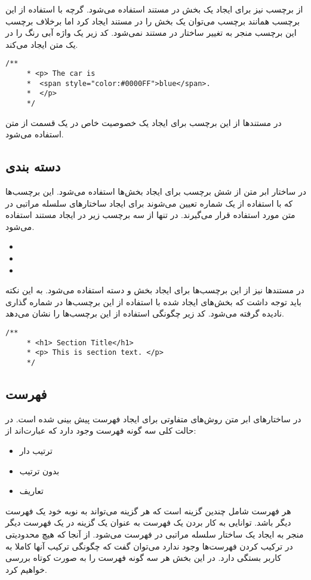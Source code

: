 از برچسب  نیز برای ایجاد یک بخش در مستند استفاده می‌شود. گرچه با استفاده از این برچسب
همانند برچسب  می‌توان یک بخش را در مستند ایجاد کرد اما برخلاف برچسب  این برچسب
منجر به تغییر ساختار در مستند نمی‌شود. کد زیر یک واژه آبی رنگ را در یک متن ایجاد می‌کند.
\begin{latin}
\lstset{language=C++}  
\begin{lstlisting}[frame=single] 
    /**
     * <p> The car is 
     * 	<span style="color:#0000FF">blue</span>.
     * 	</p>
     */
\end{lstlisting}
\end{latin}
در مستندها از این برچسب برای ایجاد یک خصوصیت خاص در یک قسمت از متن استفاده می‌شود.


\subsection{دسته بندی}
در ساختار ابر متن از شش برچسب برای ایجاد بخش‌ها استفاده می‌شود. این برچسب‌ها که با استفاده از
یک شماره تعیین می‌شوند برای ایجاد ساختارهای سلسله مراتبی در متن مورد استفاده قرار می‌گیرند. در
تنها از سه برچسب زیر در ایجاد مستند استفاده می‌شود.
\begin{itemize}
 \item {}
 \item {}
 \item {}
\end{itemize}
در مستندها نیز از این برچسب‌ها برای ایجاد بخش و دسته استفاده می‌شود. به این نکته باید توجه داشت که
بخش‌های ایجاد شده با استفاده از این برچسب‌ها در شماره گذاری نادیده گرفته می‌شود. کد زیر چگونگی 
استفاده از این برچسب‌ها را نشان می‌دهد.
\begin{latin}
\lstset{language=C++}  
\begin{lstlisting}[frame=single] 
    /**
     * <h1> Section Title</h1>
     * <p> This is section text. </p>
     */
\end{lstlisting}
\end{latin}

\subsection{فهرست}
در ساختارهای ابر متن روش‌های متفاوتی برای ایجاد فهرست پیش بینی شده است. در حالت کلی سه
گونه فهرست وجود دارد که عبارت‌اند از:
\begin{itemize}
 \item ترتیب دار
 \item بدون ترتیب
 \item تعاریف
\end{itemize}
هر فهرست شامل چندین گزینه است که هر گزینه می‌تواند به نوبه خود یک فهرست دیگر باشد. توانایی
به کار بردن یک فهرست به عنوان یک گزینه در یک فهرست دیگر منجر به ایجاد یک ساختار سلسله مراتبی
در فهرست می‌شود. از آنجا که هیچ محدودیتی در ترکیب کردن فهرست‌ها وجود ندارد می‌توان گفت که 
چگونگی ترکیب آنها کاملا به کاربر بستگی دارد. در این بخش هر سه گونه فهرست را به صورت کوتاه بررسی
خواهیم کرد.
